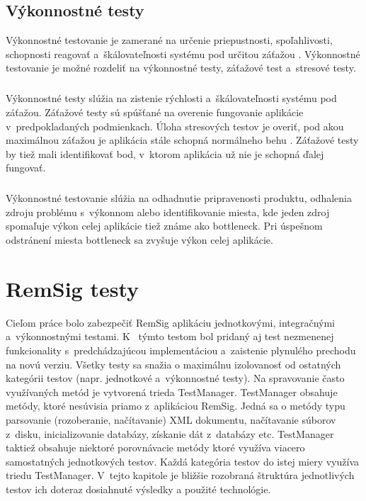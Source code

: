 \documentclass[
  digital, %
  table,   %
oneside,
  nolof,     %
  nolot,     %
]{fithesis3}
\begin{document}
\section{Výkonnostné testy}
Výkonnostné testovanie je zamerané na určenie priepustnosti, spoľahlivosti, schopnosti reagovať a~škálovateľnosti systému pod určitou záťažou \cite{perfromanceTest}\cite{ssl3.0}. Výkonnostné testovanie je možné rozdeliť na výkonnostné testy, záťažové test a~stresové testy.\paragraph{}
Výkonnostné testy slúžia na zistenie rýchlosti a~škálovateľnosti systému pod záťažou. Záťažové testy sú spúšťané na overenie fungovanie aplikácie v~predpokladaných podmienkach. Úloha stresových  testov je overiť, pod akou maximálnou záťažou je aplikácia stále schopná normálneho behu \cite{effectiveSoftwareTesting}. Záťažové testy by tiež mali identifikovať bod, v~ktorom aplikácia už nie je schopná ďalej fungovať.\paragraph{}
Výkonnostné testovanie slúžia na odhadnutie pripravenosti produktu, odhalenia zdroju problému s~výkonnom alebo  identifikovanie miesta, kde jeden zdroj spomaľuje výkon celej aplikácie tiež známe ako bottleneck. Pri úspešnom odstránení miesta bottleneck sa zvyšuje výkon celej aplikácie.
\chapter{RemSig testy}
Cieľom práce bolo zabezpečiť  RemSig aplikáciu jednotkovými, integračnými a~výkonnostnými testami. K~ týmto testom bol pridaný aj test nezmenenej funkcionality s~predchádzajúcou implementáciou a~zaistenie plynulého prechodu na novú verziu. Všetky  testy sa snažia o maximálnu izolovanosť od ostatných kategórii  testov (napr. jednotkové a~výkonnostné testy). Na spravovanie často využívaných metód je vytvorená trieda TestManager. TestManager obsahuje metódy, ktoré nesúvisia priamo z~aplikáciou RemSig. Jedná sa o metódy typu parsovanie (rozoberanie, načítavanie) XML dokumentu, načítavanie súborov z~disku, inicializovanie databázy, získanie dát z~databázy etc. TestManager taktiež obsahuje niektoré porovnávacie metódy ktoré využíva viacero samostatných jednotkových testov. Každá kategória testov do istej miery využíva triedu TestManager. V~tejto kapitole je bližšie rozobraná štruktúra jednotlivých testov ich doteraz dosiahnuté výsledky a použité technológie.
\end{document}
